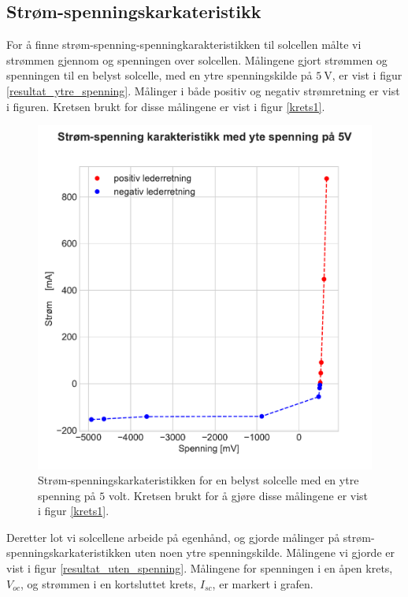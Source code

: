 \documentclass[%
 reprint,
 amsmath,amssymb,
 aps,
 norsk,
 booktabs
]{revtex4-1}
\begin{document}
\subsection{Strøm-spenningskarkateristikk}
For å finne strøm-spenning-spenningkarakteristikken til solcellen målte vi strømmen gjennom og spenningen over solcellen. Målingene gjort strømmen og spenningen til en belyst solcelle, med en ytre spenningskilde på $\SI{5}{\volt}$, er vist i figur \vref{resultat_ytre_spenning}. Målinger i både positiv og negativ strømretning er vist i figuren. Kretsen brukt for disse målingene er vist i figur \vref{krets1}.
\begin{figure}
  \centering
  \includegraphics[scale=0.4]{ytre_spenning.pdf}
  \caption{Strøm-spenningskarkateristikken for en belyst solcelle med en ytre spenning på $5$ volt. Kretsen brukt for å gjøre disse målingene er vist i figur \vref{krets1}.}
  \label{resultat_ytre_spenning}
\end{figure}
Deretter lot vi solcellene arbeide på egenhånd, og gjorde målinger på strøm-spenningskarkateristikken uten noen ytre spenningskilde. Målingene vi gjorde er vist i figur \vref{resultat_uten_spenning}. Målingene for spenningen i en åpen krets, $V_{oc}$, og strømmen i en kortsluttet krets, $I_{sc}$, er markert i grafen.
\end{document}
